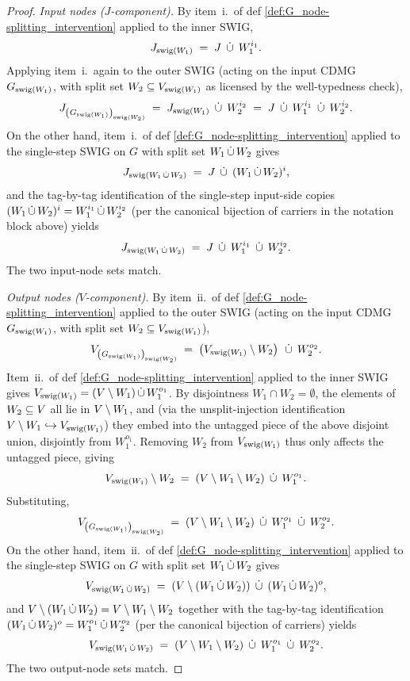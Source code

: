 \documentclass[main]{subfiles}
\begin{document}
\begin{proof}
\medskip\noindent\emph{Input nodes ($J$-component).}
By item~i.\ of def \ref{def:G_node-splitting_intervention} applied to the inner SWIG,
\[ J_{\mathrm{swig}(W_1)} \;=\; J \;\,\dot{\cup}\,\; W_1^{i_1}. \]
Applying item~i.\ again to the outer SWIG (acting on the input CDMG $G_{\mathrm{swig}(W_1)}$, with split set $W_2 \subseteq V_{\mathrm{swig}(W_1)}$ as licensed by the well-typedness check),
\[
    J_{\left ( G_{\mathrm{swig}(W_1)} \right )_{\mathrm{swig}(W_2)}} \;=\; J_{\mathrm{swig}(W_1)} \;\,\dot{\cup}\,\; W_2^{i_2} \;=\; J \;\,\dot{\cup}\,\; W_1^{i_1} \;\,\dot{\cup}\,\; W_2^{i_2}.
\]
On the other hand, item~i.\ of def \ref{def:G_node-splitting_intervention} applied to the single-step SWIG on $G$ with split set $W_1 \,\dot{\cup}\, W_2$ gives
\[ J_{\mathrm{swig}(W_1 \,\dot{\cup}\, W_2)} \;=\; J \;\,\dot{\cup}\,\; (W_1 \,\dot{\cup}\, W_2)^i, \]
and the tag-by-tag identification of the single-step input-side copies $(W_1 \,\dot{\cup}\, W_2)^i = W_1^{i_1} \,\dot{\cup}\, W_2^{i_2}$ (per the canonical bijection of carriers in the notation block above) yields
\[ J_{\mathrm{swig}(W_1 \,\dot{\cup}\, W_2)} \;=\; J \;\,\dot{\cup}\,\; W_1^{i_1} \;\,\dot{\cup}\,\; W_2^{i_2}. \]
The two input-node sets match. \checkmark

\medskip\noindent\emph{Output nodes ($V$-component).}
By item~ii.\ of def \ref{def:G_node-splitting_intervention} applied to the outer SWIG (acting on the input CDMG $G_{\mathrm{swig}(W_1)}$, with split set $W_2 \subseteq V_{\mathrm{swig}(W_1)}$),
\[ V_{\left ( G_{\mathrm{swig}(W_1)} \right )_{\mathrm{swig}(W_2)}} \;=\; \left ( V_{\mathrm{swig}(W_1)} \setminus W_2 \right ) \;\,\dot{\cup}\,\; W_2^{o_2}. \]
Item~ii.\ of def \ref{def:G_node-splitting_intervention} applied to the inner SWIG gives $V_{\mathrm{swig}(W_1)} = (V \setminus W_1) \,\dot{\cup}\, W_1^{o_1}$. By disjointness $W_1 \cap W_2 = \emptyset$, the elements of $W_2 \subseteq V$ all lie in $V \setminus W_1$, and (via the unsplit-injection identification $V \setminus W_1 \hookrightarrow V_{\mathrm{swig}(W_1)}$) they embed into the untagged piece of the above disjoint union, disjointly from $W_1^{o_1}$. Removing $W_2$ from $V_{\mathrm{swig}(W_1)}$ thus only affects the untagged piece, giving
\[ V_{\mathrm{swig}(W_1)} \setminus W_2 \;=\; (V \setminus W_1 \setminus W_2) \;\,\dot{\cup}\,\; W_1^{o_1}. \]
Substituting,
\[ V_{\left ( G_{\mathrm{swig}(W_1)} \right )_{\mathrm{swig}(W_2)}} \;=\; (V \setminus W_1 \setminus W_2) \;\,\dot{\cup}\,\; W_1^{o_1} \;\,\dot{\cup}\,\; W_2^{o_2}. \]
On the other hand, item~ii.\ of def \ref{def:G_node-splitting_intervention} applied to the single-step SWIG on $G$ with split set $W_1 \,\dot{\cup}\, W_2$ gives
\[ V_{\mathrm{swig}(W_1 \,\dot{\cup}\, W_2)} \;=\; (V \setminus (W_1 \,\dot{\cup}\, W_2)) \;\,\dot{\cup}\,\; (W_1 \,\dot{\cup}\, W_2)^o, \]
and $V \setminus (W_1 \,\dot{\cup}\, W_2) = V \setminus W_1 \setminus W_2$ together with the tag-by-tag identification $(W_1 \,\dot{\cup}\, W_2)^o = W_1^{o_1} \,\dot{\cup}\, W_2^{o_2}$ (per the canonical bijection of carriers) yields
\[ V_{\mathrm{swig}(W_1 \,\dot{\cup}\, W_2)} \;=\; (V \setminus W_1 \setminus W_2) \;\,\dot{\cup}\,\; W_1^{o_1} \;\,\dot{\cup}\,\; W_2^{o_2}. \]
The two output-node sets match. \checkmark


\end{proof}
\end{document}
